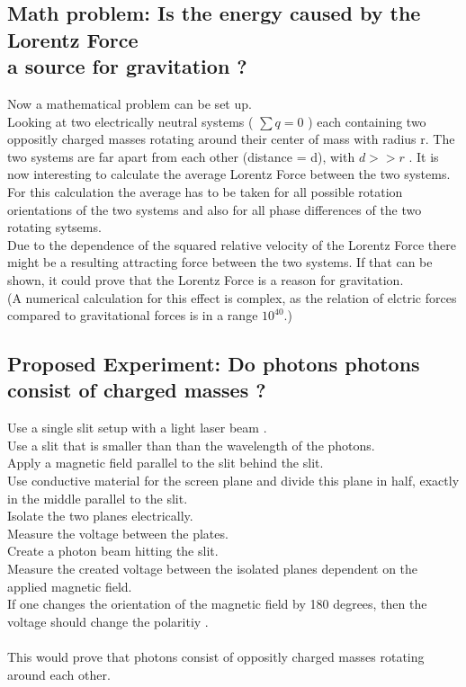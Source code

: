 \documentclass[10pt,titlepage]{article}
\begin{document}

\subsection{Math problem: Is the energy caused by the Lorentz Force\\ a source for gravitation ?}
Now a mathematical problem can be set up.\\
Looking at two electrically neutral systems ( $\sum{q}=0$ ) each containing two oppositly charged masses rotating around their center of mass with radius r. The two systems are far apart from each other (distance = d), with $d >> r$ . It is now interesting to calculate the average Lorentz Force between the two systems. For this calculation the average has to be taken for all possible rotation orientations of the two systems and also for all phase differences of the two rotating sytsems. \\
Due to the dependence of the squared relative velocity of the Lorentz Force there might be a resulting attracting force between the two systems. 
If that can be shown, it could prove that the Lorentz Force is a reason for gravitation.
\\(A numerical calculation for this effect is complex, as the relation of elctric forces compared to gravitational forces is in a range $10^{40}$.)
\\


\subsection{Proposed Experiment: Do photons photons consist of charged masses ?}
Use a single slit setup with a light laser beam .\\
Use a slit that is smaller than than the wavelength of the photons.\\
Apply a magnetic field parallel to the slit behind the slit.\\
Use conductive material for the screen plane and divide this plane in half, exactly in the middle parallel to the slit.\\
Isolate the two planes electrically.\\
Measure the voltage between the plates.\\
Create a photon beam hitting the slit.\\
Measure the created voltage between the isolated planes dependent on the applied magnetic field.\\
If one changes the orientation of the magnetic field by 180 degrees, then
the voltage should change the polaritiy .\\\\
This would prove that photons consist of oppositly charged masses rotating around each other.
\\
\end{document}
